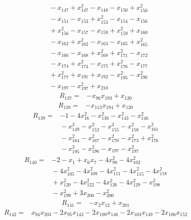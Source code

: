 {\begin{align*}
&{}  - x_{147} + x_{147}^{2} - x_{148} - x_{150} + x_{150}^{2} \\
&{}  - x_{151} - x_{153} + x_{153}^{2} - x_{154} - x_{156} \\
&{}  + x_{156}^{2} - x_{157} - x_{159} + x_{159}^{2} + x_{160} \\
&{}  - x_{162} + x_{162}^{2} - x_{163} - x_{165} + x_{165}^{2} \\
&{}  - x_{166} - x_{168} + x_{168}^{2} + x_{171}^{2} - x_{172} \\
&{}  - x_{174} + x_{174}^{2} - x_{175} + x_{176}^{2} - x_{177} \\
&{}  + x_{177}^{2} + x_{191} + x_{192} - x_{195}^{2} - x_{196}^{2} \\
&{}  - x_{197} - x_{197}^{2} + x_{210}
\end{align*}
\begin{align*}
R_{137} ={}& -x_{96} x_{193} + x_{120}
\end{align*}
\begin{align*}
R_{138} ={}& -x_{113} x_{194} + x_{120}
\end{align*}
\begin{align*}
R_{139} ={}& -1 - 4x_{16}^{2} - x_{136}^{2} - x_{143}^{2} - x_{146}^{2} \\
&{}  - x_{149}^{2} - x_{152}^{2} - x_{155}^{2} - x_{158}^{2} - x_{161}^{2} \\
&{}  - x_{164}^{2} - x_{167}^{2} - x_{170}^{2} - x_{173}^{2} + x_{176}^{2} \\
&{}  - x_{195}^{2} - x_{196}^{2} - x_{197} - x_{197}^{2}
\end{align*}
\begin{align*}
R_{140} ={}& -2 - x_{1} + x_{6} x_{7} - 4x_{98}^{2} - 4x_{102}^{2} \\
&{}  - 4x_{105}^{2} - 4x_{108}^{2} - 4x_{111}^{2} - 4x_{115}^{2} - 4x_{118}^{2} \\
&{}  + x_{120}^{2} - 4x_{122}^{2} - 4x_{126}^{2} - 4x_{129}^{2} - x_{198}^{2} \\
&{}  - x_{199}^{2} + 3x_{200} - x_{200}^{2}
\end{align*}
\begin{align*}
R_{141} ={}& -x_{2} x_{12} + x_{201}
\end{align*}
\begin{align*}
R_{142} ={}& x_{94} x_{203} - 2x_{95} x_{143} - 2x_{100} x_{146} - 2x_{103} x_{149} - 2x_{106} x_{152} \\

\end{align*}}
